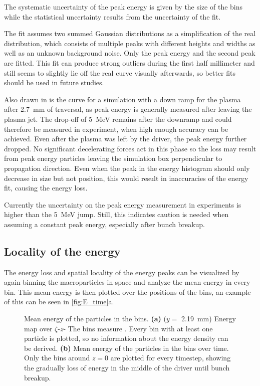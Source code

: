 \documentclass[bachelor_thesis]{subfiles}
\begin{document}
The systematic uncertainty of the peak energy is given by the size of the bins while the statistical uncertainty results from the uncertainty of the fit. 

The fit assumes two summed Gaussian distributions as a simplification of the real distribution, which consists of multiple peaks with different heights and widths as well as an unknown background noise. Only the peak energy and the second peak are fitted.
This fit can produce strong outliers during the first half millimeter and still seems to slightly lie off the real curve visually afterwards, so better fits should be used in future studies.

Also drawn in is the curve for a simulation with a down ramp for the plasma after \qty{2.7}{\mm} of traversal, as peak energy is generally measured after leaving the plasma jet. The drop-off of \qty{5}{\MeV} remains after 
the downramp and could therefore be measured in experiment, when high enough accuracy can be achieved. Even after the plasma was left by the driver, the peak energy further dropped. No significant decelerating forces act in this phase so the loss may result
from peak energy particles leaving the simulation box perpendicular to propagation direction. Even when the peak in the energy histogram should only decrease in size but not position, this would result in inaccuracies of the energy fit,
causing the energy loss.

Currently the uncertainty on the peak energy measurement in experiments is higher than the \qty{5}{\MeV} jump. Still, this indicates caution is needed when assuming a constant peak energy, especially after bunch breakup.

\subsection{Locality of the energy}\label{chap:loc_E}
The energy loss and spatial locality of the energy peaks can be visualized by again binning the macroparticles in space and analyze the mean energy in every bin. This mean energy is then plotted over the positions of the bins,
an example of this can be seen in \autoref{fig:E_time}a. 
\begin{figure}
	\centering
	
	\caption{Mean energy of the particles in the bins.
	\textbf{(a)} ($y=$ \qty{2.19}{mm}) Energy map over $\zeta$-$z$- The bins measure . Every bin with at least one particle is plotted, so no information about the energy density can be derived.
	\textbf{(b)} Mean energy of the particles in the bins over time. Only the bins around $z=0$ are plotted for every timestep, showing the gradually loss of energy in the middle of the driver until bunch breakup.}
	\label{fig:E_time}
\end{figure}
\end{document}
